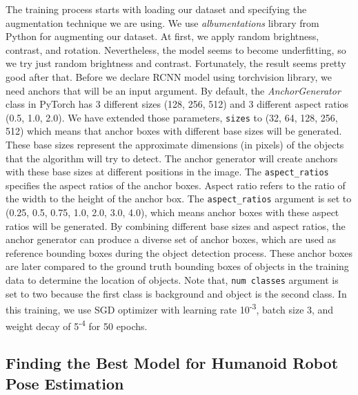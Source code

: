 The training process starts with loading our dataset and specifying the augmentation technique we are using. We use \emph{albumentations} library from Python for augmenting our dataset.
At first, we apply random brightness, contrast, and rotation. Nevertheless, the model seems to become underfitting, so we try just random brightness and contrast. Fortunately, the result seems pretty good after that.
Before we declare RCNN model using torchvision library, we need anchors that will be an input argument. 
By default, the \emph{AnchorGenerator} class in PyTorch has 3 different sizes (128, 256, 512) and 3 different aspect ratios (0.5, 1.0, 2.0).
We have extended those parameters, \verb|sizes| to (32, 64, 128, 256, 512) which means that anchor boxes with different base sizes will be generated. These base sizes represent the approximate dimensions (in pixels) of the objects that the algorithm will try to detect.
The anchor generator will create anchors with these base sizes at different positions in the image.
The \verb|aspect_ratios| specifies the aspect ratios of the anchor boxes. Aspect ratio refers to the ratio of the width to the height of the anchor box.
The \verb|aspect_ratios| argument is set to (0.25, 0.5, 0.75, 1.0, 2.0, 3.0, 4.0), which means anchor boxes with these aspect ratios will be generated. By combining different base sizes and aspect ratios, the anchor generator can produce a diverse set of anchor boxes,
which are used as reference bounding boxes during the object detection process. These anchor boxes are later compared to the ground truth bounding boxes of objects in the training data to determine the location of objects.
Note that, \verb|num classes| argument is set to two because the first class is background and object is the second class.
In this training, we use SGD optimizer with learning rate 10\textsuperscript{-3}, batch size 3, and weight decay of 5\textsuperscript{-4} for 50 epochs.

\subsection{Finding the Best Model for Humanoid Robot Pose Estimation}
\label{subsec:finding-best-model-humanoid-robot}


